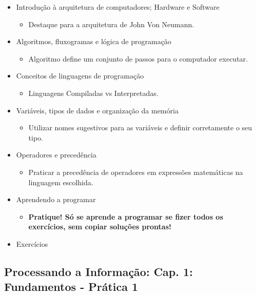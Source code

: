 \documentclass[12pt,a4paper]{article}
\providecommand{\tightlist}{%
      \setlength{\itemsep}{0pt}\setlength{\parskip}{0pt}}
\begin{document}
\begin{itemize}
\tightlist
\item
  Introdução à arquitetura de computadores; Hardware e Software

  \begin{itemize}
  \tightlist
  \item
    Destaque para a arquitetura de John Von Neumann.
  \end{itemize}
\item
  Algoritmos, fluxogramas e lógica de programação

  \begin{itemize}
  \tightlist
  \item
    Algoritmo define um conjunto de passos para o computador executar.
  \end{itemize}
\item
  Conceitos de linguagens de programação

  \begin{itemize}
  \tightlist
  \item
    Linguagens Compiladas vs Interpretadas.
  \end{itemize}
\item
  Variáveis, tipos de dados e organização da memória

  \begin{itemize}
  \tightlist
  \item
    Utilizar nomes sugestivos para as variáveis e definir corretamente o
    seu tipo.
  \end{itemize}
\item
  Operadores e precedência

  \begin{itemize}
  \tightlist
  \item
    Praticar a precedência de operadores em expressões matemáticas na
    linguagem escolhida.
  \end{itemize}
\item
  Aprendendo a programar

  \begin{itemize}
  \tightlist
  \item
    \textbf{Pratique! Só se aprende a programar se fizer todos os
    exercícios, sem copiar soluções prontas!}
  \end{itemize}
\item
  Exercícios
\end{itemize}

    \hypertarget{processando-a-informauxe7uxe3o-cap.-1-fundamentos---pruxe1tica-1}{%
\subsection{Processando a Informação: Cap. 1: Fundamentos - Prática
1}\label{processando-a-informauxe7uxe3o-cap.-1-fundamentos---pruxe1tica-1}}
\end{document}
